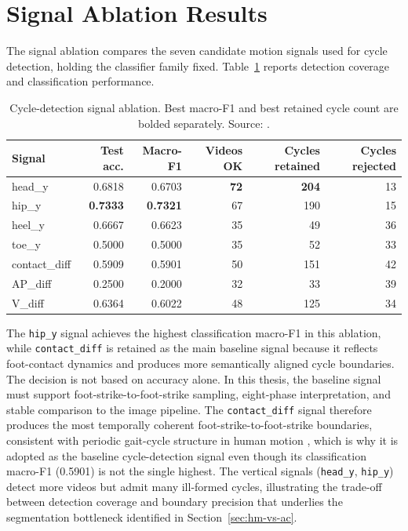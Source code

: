 \section{Signal Ablation Results}
\label{sec:signal-ablation}

The signal ablation compares the seven candidate motion signals used for
cycle detection, holding the classifier family fixed. Table~\ref{tab:signal}
reports detection coverage and classification performance.

\begin{table}[htbp]
\centering
\caption[Cycle-detection signal ablation. Source: \protect{}.]{Cycle-detection signal ablation. Best macro-F1 and best retained cycle count are bolded separately. Source: .}
\label{tab:signal}
\small
\begin{tabular}{lrrrrr}
\toprule
Signal & Test acc. & Macro-F1 & Videos OK & Cycles retained & Cycles rejected \\
\midrule
head\_y & 0.6818 & 0.6703 & \textbf{72} & \textbf{204} & 13 \\
hip\_y & \textbf{0.7333} & \textbf{0.7321} & 67 & 190 & 15 \\
heel\_y & 0.6667 & 0.6623 & 35 & 49 & 36 \\
toe\_y & 0.5000 & 0.5000 & 35 & 52 & 33 \\
contact\_diff & 0.5909 & 0.5901 & 50 & 151 & 42 \\
AP\_diff & 0.2500 & 0.2000 & 32 & 33 & 39 \\
V\_diff & 0.6364 & 0.6022 & 48 & 125 & 34 \\
\bottomrule
\end{tabular}
\end{table}

The \texttt{hip\_y} signal achieves the highest classification macro-F1 in this
ablation, while \texttt{contact\_diff} is retained as the main baseline signal
because it reflects foot-contact dynamics and produces more semantically
aligned cycle boundaries. The decision is not based on accuracy alone. In this
thesis, the baseline signal must support foot-strike-to-foot-strike sampling,
eight-phase interpretation, and stable comparison to the image pipeline. The
\texttt{contact\_diff} signal therefore produces the most temporally coherent
foot-strike-to-foot-strike boundaries, consistent with periodic gait-cycle structure in human motion \cite{cutting1978gaitperiodicity,plotnik2007gaitasymmetry}, which is why it is adopted as the
baseline cycle-detection signal even though its classification macro-F1
(0.5901) is not the single highest. The vertical signals
(\texttt{head\_y}, \texttt{hip\_y}) detect more videos but admit many
ill-formed cycles, illustrating the trade-off between detection coverage and
boundary precision that underlies the segmentation bottleneck identified in
Section~\ref{sec:hm-vs-ac}.


